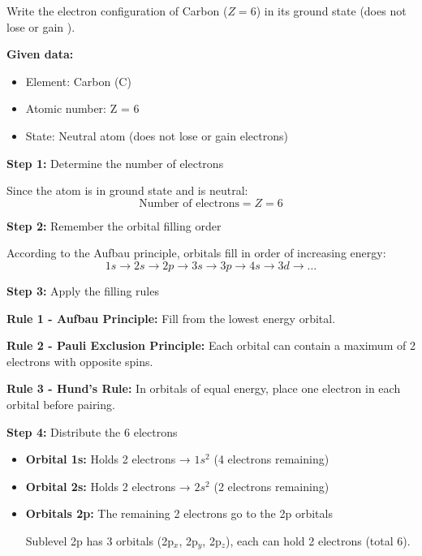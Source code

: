 \begin{exercise}
    Write the electron configuration of Carbon (\( Z = 6 \)) in its ground state (does not lose or gain \el{}).

    \begin{solu}
        \textbf{Given data:}
        \begin{itemize}
            \item Element: Carbon (C)
            \item Atomic number: Z = 6
            \item State: Neutral atom (does not lose or gain electrons)
        \end{itemize}

        \textbf{Step 1:} Determine the number of electrons

        Since the atom is in ground state and is neutral:
        \[
            \text{Number of electrons} = Z = 6
        \]

        \textbf{Step 2:} Remember the orbital filling order

        According to the Aufbau principle, orbitals fill in order of increasing energy:
        \[
            1s \rightarrow 2s \rightarrow 2p \rightarrow 3s \rightarrow 3p \rightarrow 4s \rightarrow 3d \rightarrow \ldots
        \]

        \textbf{Step 3:} Apply the filling rules

        \textbf{Rule 1 - Aufbau Principle:} Fill from the lowest energy orbital.

        \textbf{Rule 2 - Pauli Exclusion Principle:} Each orbital can contain a maximum of 2 electrons with opposite spins.

        \textbf{Rule 3 - Hund's Rule:} In orbitals of equal energy, place one electron in each orbital before pairing.

        \textbf{Step 4:} Distribute the 6 electrons

        \begin{itemize}
            \item \textbf{Orbital 1s:} Holds 2 electrons → \(1s^2\) (4 electrons remaining)
            \item \textbf{Orbital 2s:} Holds 2 electrons → \(2s^2\) (2 electrons remaining)
            \item \textbf{Orbitals 2p:} The remaining 2 electrons go to the 2p orbitals

            Sublevel 2p has 3 orbitals (2p\(_x\), 2p\(_y\), 2p\(_z\)), each can hold 2 electrons (total 6).


\end{itemize}
\end{solu}
\end{exercise}
